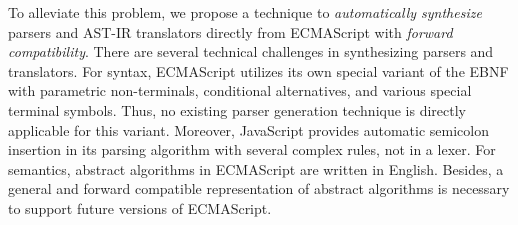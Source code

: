 To alleviate this problem, we propose a technique to \textit{automatically
synthesize} parsers and AST-IR translators directly from ECMAScript with
\textit{forward compatibility}. There are several technical challenges in
synthesizing parsers and translators. For syntax, ECMAScript utilizes its own
special variant of the EBNF with parametric non-terminals, conditional
alternatives, and various special terminal symbols.  Thus, no existing parser
generation technique is directly applicable for this variant.  Moreover,
JavaScript provides automatic semicolon insertion in its parsing algorithm with
several complex rules, not in a lexer. For semantics, abstract algorithms in
ECMAScript are written in English.  Besides, a general and forward compatible
representation of abstract algorithms is necessary to support future
versions of ECMAScript.

